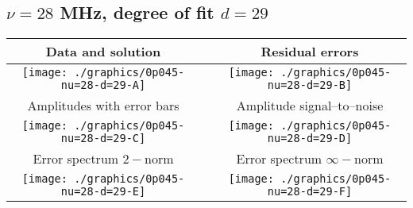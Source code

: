 

% 

\clearpage{}
\break{}

\subsection{$\nu = 28$ MHz, degree of fit $d = 29$}

\begin{table}[h]
    \begin{center}
        \begin{tabular}{ccc}
            Data and solution & \quad & Residual errors \\\hline
            \texttt{[image: ./graphics/0p045-nu=28-d=29-A]} &&
            \texttt{[image: ./graphics/0p045-nu=28-d=29-B]} \\[15pt]
            Amplitudes with error bars && Amplitude signal--to--noise \\\hline
            \texttt{[image: ./graphics/0p045-nu=28-d=29-C]} &&
            \texttt{[image: ./graphics/0p045-nu=28-d=29-D]} \\[15pt]
            Error spectrum $2-$norm && Error spectrum $\infty-$norm \\\hline
            \texttt{[image: ./graphics/0p045-nu=28-d=29-E]} &&
            \texttt{[image: ./graphics/0p045-nu=28-d=29-F]} \\[15pt]
        \end{tabular}
    \end{center}
\label{fig:elev=45, nu=28}
\end{table}



\endinput
